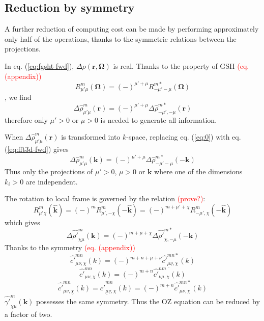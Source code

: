 \subsection{Reduction by symmetry\label{sub:Reduction-by-symmetry}}

A further reduction of computing cost can be made by performing approximately
only half of the operations, thanks to the symmetric relations between
the projections.

In eq. (\ref{eq:fgsht-fwd}), $\Delta\rho(\mathbf{r},\mathbf{\Omega})$
is real. Thanks to the property of GSH \textcolor{red}{(eq. (appendix))}
\[
R_{\mu'\mu}^{m}(\mathbf{\Omega})=(-)^{\mu'+\mu}R_{-\mu'-\mu}^{m*}(\mathbf{\Omega})
\],
we find
\begin{equation}
\Delta\hat{\rho}_{\mu'\mu}^{m}(\mathbf{r})=(-)^{\mu'+\mu}\Delta\hat{\rho}_{-\mu',-\mu}^{m*}(\mathbf{r})\label{eq:0}
\end{equation}
therefore only $\mu'>0$ or $\mu>0$ is needed to generate all information.

When $\Delta\hat{\rho}_{\mu'\mu}^{m}(\mathbf{r})$ is transformed
into $k$-space, replacing eq. (\ref{eq:0}) with eq. (\ref{eq:fft3d-fwd})
gives
\begin{equation}
\Delta\hat{\rho}_{\mu'\mu}^{m}(\mathbf{k})=(-)^{\mu'+\mu}\Delta\hat{\rho}_{-\mu'-\mu}^{m*}(-\mathbf{k})\label{eq:1}
\end{equation}
Thus only the projections of $\mu'>0$, $\mu>0$ or $\mathbf{k}$
where one of the dimensions $k_{i}>0$ are independent.

The rotation to local frame is governed by the relation \textcolor{red}{(prove?)}:
\begin{equation}
R_{\mu'\chi}^{m}(\hat{\mathbf{k}})=(-)^{m}R_{\mu',-\chi}^{m}(-\hat{\mathbf{k}})=(-)^{m+\mu'+\chi}R_{-\mu',\chi}^{m}(-\hat{\mathbf{k}})\label{eq:3}
\end{equation}
which gives
\begin{equation}
\Delta\hat{\rho'}_{\chi\mu}^{m}(\mathbf{k})=(-)^{m+\mu+\chi}\Delta\hat{\rho'}_{\chi,-\mu}^{m*}(-\mathbf{k})\label{eq:2}
\end{equation}
Thanks to the symmetry\textcolor{red}{{} (eq. (appendix))} 
\begin{equation}
\hat{c'}_{\mu\nu,\chi}^{mn}(k)=(-)^{m+n+\mu+\nu}\hat{c'}_{\underline{\mu}\underline{\nu},\chi}^{mn*}(k)
\end{equation}
\begin{equation}
\hat{c'}_{\mu\nu,\chi}^{mn}(k)=(-)^{m+n}\hat{c'}_{\nu\mu,\chi}^{nm}(k)
\end{equation}
\begin{equation}
\hat{c'}_{\mu\nu,\underline{\chi}}^{mn}(k)=\hat{c'}_{\underline{\mu}\underline{\nu},\chi}^{mn}(k)=(-)^{m+n}\hat{c'}_{\mu\nu,\chi}^{mn*}(k)
\end{equation}
$\hat{\gamma'}_{\chi\mu}^{m}(\mathbf{k})$ possesses the same symmetry.
Thus the OZ equation can be reduced by a factor of two.

